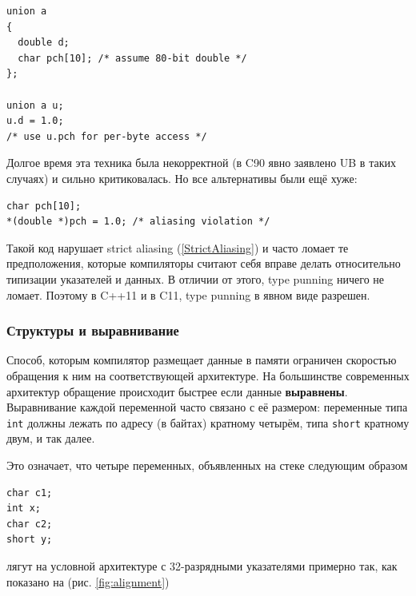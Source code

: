 \documentclass[a4paper,12pt,oneside]{article}
\begin{document}
\begin{lstlisting}
union a
{
  double d;
  char pch[10]; /* assume 80-bit double */
};

union a u;
u.d = 1.0;
/* use u.pch for per-byte access */
\end{lstlisting}

Долгое время эта техника была некорректной (в C90 явно заявлено UB в таких случаях) и сильно критиковалась. Но все альтернативы были ещё хуже:

\begin{lstlisting}
char pch[10];
*(double *)pch = 1.0; /* aliasing violation */
\end{lstlisting}

Такой код нарушает strict aliasing (\ref{StrictAliasing}) и часто ломает те предположения, которые компиляторы считают себя вправе делать относительно типизации указателей и данных. В отличии от этого, type punning ничего не ломает. Поэтому в C++11 и в C11, type punning в явном виде разрешен.

\subsubsection{Структуры и выравнивание}

Способ, которым компилятор размещает данные в памяти ограничен скоростью обращения к ним на соответствующей архитектуре. На большинстве современных архитектур обращение происходит быстрее если данные \textbf{выравнены}. Выравнивание каждой переменной часто связано с её размером: переменные типа \lstinline!int! должны лежать по адресу (в байтах) кратному четырём, типа \lstinline!short! кратному двум, и так далее.

Это означает, что четыре переменных, объявленных на стеке следующим образом

\begin{lstlisting}
char c1;
int x;
char c2;
short y;
\end{lstlisting}

лягут на условной архитектуре с 32-разрядными указателями примерно так, как показано на (рис. \ref{fig:alignment})
\end{document}
